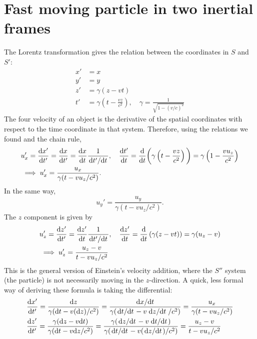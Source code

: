 \documentclass{article}
\begin{document}
    \section{Fast moving particle in two inertial frames}
        The Lorentz transformation gives the relation between the coordinates in $S$ and $S'$:
        \begin{align*}
            x' & = x \\
            y' & = y \\
            z' & = \gamma (z - vt) \\
            t' & = \gamma \left(t - \frac{v z}{c^2}\right), \quad \gamma = \frac{1}{\sqrt{1 - (v/c)^2}}
        \end{align*}
        The four velocity of an object is the derivative of the spatial coordinates with respect to the time coordinate in that system. Therefore, using the relations we found and the chain rule, 
        \begin{align*}
            &u_x' = \dv{x'}{t'} = \dv{x}{t'} = \dv{x}{t} \frac{1}{\dv*{t'}{t}}, \quad
            \dv{t'}{t} = \dv{t} \bigg( \gamma \left(t - \frac{v z}{c^2}\right)\bigg) = \gamma \left(1 - \frac{v u_z}{c^2}\right) \\
            &\implies u_x' = \frac{u_x}{\gamma (t - v u_z/c^2)}.
        \end{align*}
        In the same way,
        \begin{equation*}
            u_y' = \frac{u_y}{\gamma (t - v u_z/c^2)}.
        \end{equation*}
        The $z$ component is given by
        \begin{align*}
            &u_z' = \dv{z'}{t'} = \dv{z'}{t} \frac{1}{\dv*{t'}{t}}, \quad \dv{z'}{t} = \dv{t} \left(\gamma (z - vt) \right) = \gamma (u_z - v) \\
            & \implies u_z' = \frac{u_z - v}{t - v u_z /c^2}
        \end{align*}
        This is the general version of Einstein's velocity addition, where the $S''$ system (the particle) is not necessarily moving in the $z$-direction. A quick, less formal way of deriving these formula is taking the differential:
        \begin{align*}
            & \dv{x'}{t'} = \frac{\dd z}{\gamma(\dd t - v (\dd z)/c^2)} = \frac{\dv*{x}{t}}{\gamma (\dv*{t}{t} - v \dv*{z}{t}/c^2)} = \frac{u_x}{\gamma (t - v u_z/c^2)} \\
            & \dv{z'}{t'} = \frac{\gamma(\dd z - v \dd t)}{\gamma (\dd t - v \dd z/c^2)} = \frac{\gamma(\dv*{z}{t} - v \dv*{t}{t})}{\gamma (\dv*{t}{t} - v (\dv*{z}{t})/c^2)} = \frac{u_z - v}{t - v u_z /c^2}
        \end{align*}
\end{document}
